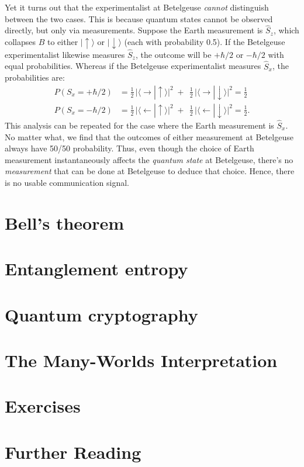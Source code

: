 \documentclass[pra,11pt]{revtex4}
\begin{document}
Yet it turns out that the experimentalist at Betelgeuse
\textit{cannot} distinguish between the two cases.  This is because
quantum states cannot be observed directly, but only via measurements.
Suppose the Earth measurement is $\hat{S}_z$, which collapses $B$ to
either $|\!\uparrow\rangle$ or $|\!\downarrow\rangle$ (each with
probability 0.5).  If the Betelgeuse experimentalist likewise measures
$\hat{S}_z$, the outcome will be $+\hbar/2$ or $-\hbar/2$ with equal
probabilities.  Whereas if the Betelgeuse experimentalist measures
$\hat{S}_x$, the probabilities are:
$$\begin{aligned}P(S_x = +\hbar/2) &= \frac{1}{2}\, \Big|\langle\!\rightarrow|\!\uparrow\rangle\Big|^2 \;+\;\, \frac{1}{2}\, \Big|\langle\!\rightarrow|\!\downarrow\rangle\Big|^2 = \frac{1}{2}\\P(S_x = -\hbar/2) &= \frac{1}{2}\, \Big|\langle\!\leftarrow|\!\uparrow\rangle\Big|^2 \;+\;\, \frac{1}{2}\, \Big|\langle\!\leftarrow|\!\downarrow\rangle\Big|^2 = \frac{1}{2}.\end{aligned}$$
This analysis can be repeated for the case where the Earth measurement
is $\hat{S}_x$.  No matter what, we find that the outcomes of either
measurement at Betelgeuse always have 50/50 probability.  Thus, even
though the choice of Earth measurement instantaneously affects the
\textit{quantum state} at Betelgeuse, there's no \textit{measurement}
that can be done at Betelgeuse to deduce that choice.  Hence, there is
no usable communication signal.

\section{Bell's theorem}

\section{Entanglement entropy}

\section{Quantum cryptography}

\section{The Many-Worlds Interpretation}

\section{Exercises}






\section{Further Reading}


\end{document}
